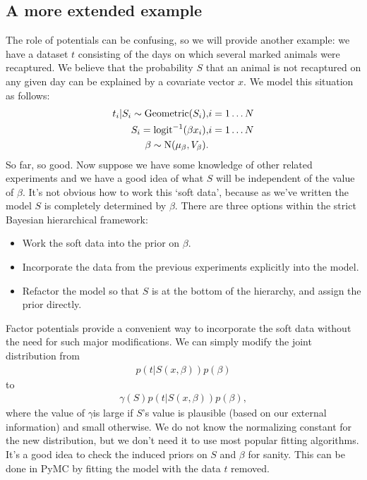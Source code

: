 \subsection*{A more extended example} 
The role of potentials can be confusing, so we will provide another example: we have a dataset $t$ consisting of the days on which several marked animals were recaptured. We believe that the probability $S$ that an animal is not recaptured on any given day can be explained by a covariate vector $x$. We model this situation as follows:
\begin{eqnarray*}
    t_i|S_i \sim \textup{Geometric}(S_i), & i=1\ldots N\\
    S_i = \textup{logit}^{-1}(\beta x_i), &i=1\ldots N\\
    \beta\sim \textup{N}(\mu_\beta, V_\beta).
\end{eqnarray*}
So far, so good. Now suppose we have some knowledge of other related experiments and we have a good idea of what $S$ will be independent of the value of $\beta$. It's not obvious how to work this `soft data', because as we've written the model $S$ is completely determined by $\beta$. There are three options within the strict Bayesian hierarchical framework:
\begin{itemize}
    \item Work the soft data into the prior on $\beta$.
    \item Incorporate the data from the previous experiments explicitly into the model.
    \item Refactor the model so that $S$ is at the bottom of the hierarchy, and assign the prior directly.
\end{itemize}

Factor potentials provide a convenient way to incorporate the soft data without the need for such major modifications. We can simply modify the joint distribution from
\begin{eqnarray*}
    p(t|S(x,\beta)) p(\beta)
\end{eqnarray*}
to
\begin{eqnarray*}
    \gamma(S) p(t|S(x,\beta)) p(\beta),
\end{eqnarray*}
where the value of $\gamma$is large if $S$'s value is plausible (based on our external information) and small otherwise. We do not know the normalizing constant for the new distribution, but we don't need it to use most popular fitting algorithms. It's a good idea to check the induced priors on $S$ and $\beta$ for sanity. This can be done in PyMC by fitting the model with the data $t$ removed. 

